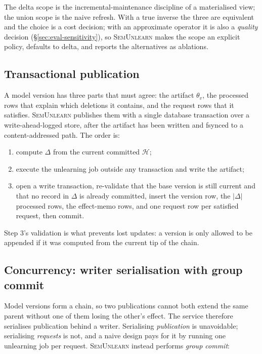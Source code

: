 \documentclass[conference]{IEEEtran}
\newcommand{\sys}{\textsc{SemUnlearn}}
\newcommand{\Hset}{\mathcal{H}}
\begin{document}
The delta scope is the incremental-maintenance discipline of a materialised view;
the union scope is the naive refresh.  With a true inverse the three are equivalent and
the choice is a cost decision; with an approximate operator it is also a \emph{quality}
decision (\S\ref{sec:eval-sensitivity}), so \sys{} makes the scope an explicit policy,
defaults to delta, and reports the alternatives as ablations.

\subsection{Transactional publication}

A model version has three parts that must agree: the artifact $\theta_v$, the
processed rows that explain which deletions it contains, and the request rows that
it satisfies.  \sys{} publishes them with a single database transaction over a
write-ahead-logged store, after the artifact has been written and fsynced to a
content-addressed path.  The order is:

\begin{enumerate}
\item compute $\Delta$ from the current committed $\Hset$;
\item execute the unlearning job outside any transaction and write the artifact;
\item open a write transaction, re-validate that the base version is still current
and that no record in $\Delta$ is already committed, insert the version row, the
$|\Delta|$ processed rows, the effect-memo rows, and one request row per satisfied
request, then commit.
\end{enumerate}

Step 3's validation is what prevents lost updates: a version is only allowed to be
appended if it was computed from the current tip of the chain.

\subsection{Concurrency: writer serialisation with group commit}
\label{sec:groupcommit}

Model versions form a chain, so two publications cannot both extend the same parent
without one of them losing the other's effect.  The service therefore serialises
publication behind a writer.  Serialising \emph{publication} is unavoidable;
serialising \emph{requests} is not, and a naive design pays for it by running one
unlearning job per request.  \sys{} instead performs \emph{group commit}:
\end{document}
